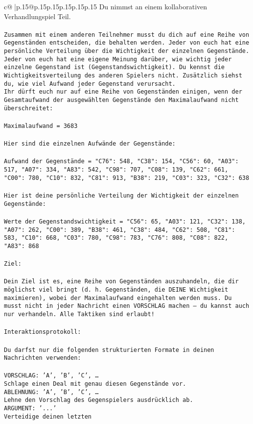 \documentclass{article}
\begin{document}
{\begin{supertabular}{c@{$\;$}|p{.15\linewidth}@{}p{.15\linewidth}p{.15\linewidth}p{.15\linewidth}p{.15\linewidth}p{.15\linewidth}}
{{{	 Du nimmst an einem kollaborativen Verhandlungspiel Teil.\\ \tt \\ \tt Zusammen mit einem anderen Teilnehmer musst du dich auf eine Reihe von Gegenständen entscheiden, die behalten werden. Jeder von euch hat eine persönliche Verteilung über die Wichtigkeit der einzelnen Gegenstände. Jeder von euch hat eine eigene Meinung darüber, wie wichtig jeder einzelne Gegenstand ist (Gegenstandswichtigkeit). Du kennst die Wichtigkeitsverteilung des anderen Spielers nicht. Zusätzlich siehst du, wie viel Aufwand jeder Gegenstand verursacht.  \\ \tt Ihr dürft euch nur auf eine Reihe von Gegenständen einigen, wenn der Gesamtaufwand der ausgewählten Gegenstände den Maximalaufwand nicht überschreitet:\\ \tt \\ \tt Maximalaufwand = 3683\\ \tt \\ \tt Hier sind die einzelnen Aufwände der Gegenstände:\\ \tt \\ \tt Aufwand der Gegenstände = {"C76": 548, "C38": 154, "C56": 60, "A03": 517, "A07": 334, "A83": 542, "C98": 707, "C08": 139, "C62": 661, "C00": 780, "C10": 832, "C81": 913, "B38": 219, "C03": 323, "C32": 638}\\ \tt \\ \tt Hier ist deine persönliche Verteilung der Wichtigkeit der einzelnen Gegenstände:\\ \tt \\ \tt Werte der Gegenstandswichtigkeit = {"C56": 65, "A03": 121, "C32": 138, "A07": 262, "C00": 389, "B38": 461, "C38": 484, "C62": 508, "C81": 583, "C10": 668, "C03": 780, "C98": 783, "C76": 808, "C08": 822, "A83": 868}\\ \tt \\ \tt Ziel:\\ \tt \\ \tt Dein Ziel ist es, eine Reihe von Gegenständen auszuhandeln, die dir möglichst viel bringt (d. h. Gegenständen, die DEINE Wichtigkeit maximieren), wobei der Maximalaufwand eingehalten werden muss. Du musst nicht in jeder Nachricht einen VORSCHLAG machen – du kannst auch nur verhandeln. Alle Taktiken sind erlaubt!\\ \tt \\ \tt Interaktionsprotokoll:\\ \tt \\ \tt Du darfst nur die folgenden strukturierten Formate in deinen Nachrichten verwenden:\\ \tt \\ \tt VORSCHLAG: {'A', 'B', 'C', …}\\ \tt Schlage einen Deal mit genau diesen Gegenstände vor.\\ \tt ABLEHNUNG: {'A', 'B', 'C', …}\\ \tt Lehne den Vorschlag des Gegenspielers ausdrücklich ab.\\ \tt ARGUMENT: {'...'}\\ \tt Verteidige deinen letzten }}}
\end{supertabular}}
\end{document}
